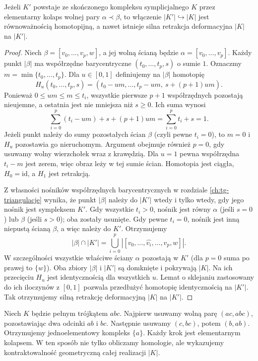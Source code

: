 \begin{stwierdzenie}
Jeżeli $K'$ powstaje ze skończonego kompleksu
symplicjalnego $K$ przez elementarny kolaps wolnej
pary $\alpha\prec\beta$, to włączenie
$|K'|\hookrightarrow|K|$ jest równoważnością homotopijną,
a nawet istnieje silna retrakcja deformacyjna
$|K|$ na $|K'|$.
\end{stwierdzenie}

\begin{proof}
Niech $\beta=[v_0,\ldots,v_p,w]$, a jej wolną ścianą
będzie $\alpha=[v_0,\ldots,v_p]$. Każdy punkt
$|\beta|$ ma współrzędne barycentryczne
$(t_0,\ldots,t_p,s)$ o sumie $1$.
Oznaczmy $m=\min\{t_0,\ldots,t_p\}$.
Dla $u\in[0,1]$ definiujemy na $|\beta|$ homotopię
\[
H_u(t_0,\ldots,t_p,s)=
(t_0-um,\ldots,t_p-um,\ s+(p+1)um).
\]
Ponieważ $0\le um\le m\le t_i$, wszystkie pierwsze
$p+1$ współrzędnych pozostają nieujemne, a ostatnia
jest nie mniejsza niż $s\ge0$. Ich suma wynosi
\[
 \sum_{i=0}^{p}(t_i-um)+s+(p+1)um
 =\sum_{i=0}^{p}t_i+s=1.
\]
Jeżeli punkt należy do sumy pozostałych ścian
$\beta$ (czyli pewne $t_i=0$), to $m=0$ i $H_u$
pozostawia go nieruchomym. Argument obejmuje również
$p=0$, gdy usuwamy wolny wierzchołek wraz z krawędzią. Dla $u=1$ pewna
współrzędna $t_i-m$ jest zerem, więc obraz leży
w tej sumie ścian. Homotopia jest ciągła,
$H_0=\mathrm{id}$, a $H_1$ jest retrakcją.

Z własności nośników współrzędnych barycentrycznych
w rozdziale \ref{ch:tg-triangulacje} wynika, że punkt
$|\beta|$ należy do $|K'|$ wtedy i tylko wtedy,
gdy jego nośnik jest sympleksem $K'$. Gdy wszystkie
$t_i>0$, nośnik jest równy $\alpha$ (jeśli $s=0$)
lub $\beta$ (jeśli $s>0$); oba zostały usunięte.
Gdy pewne $t_i=0$, nośnik jest inną niepustą ścianą
$\beta$, a więc należy do $K'$. Otrzymujemy
\[
 |\beta|\cap|K'|
 =\bigcup_{i=0}^{p}|[v_0,\ldots,\widehat{v_i},\ldots,v_p,w]|.
\]
W szczególności wszystkie właściwe ściany $\alpha$
pozostają w $K'$ (dla $p=0$ suma po prawej to $\{w\}$). Oba zbiory $|\beta|$ i $|K'|$ są domknięte
i pokrywają $|K|$. Na ich przecięciu $H_u$ jest
identycznością dla wszystkich $u$. Lemat o sklejaniu
zastosowany do ich iloczynów z $[0,1]$ pozwala
przedłużyć homotopię identycznością na $|K'|$. Tak otrzymujemy silną retrakcję
deformacyjną $|K|$ na $|K'|$.
\end{proof}

\begin{przyklad}
Niech $K$ będzie pełnym trójkątem $abc$. Najpierw
usuwamy wolną parę $(ac,abc)$, pozostawiając dwa
odcinki $ab$ i $bc$. Następnie usuwamy
$(c,bc)$, potem $(b,ab)$. Otrzymujemy jednoelementowy
kompleks $\{a\}$. Każdy krok jest elementarnym
kolapsem. W ten sposób nie tylko obliczamy homologie,
ale wykazujemy kontraktowalność geometryczną całej
realizacji $|K|$.
\end{przyklad}

